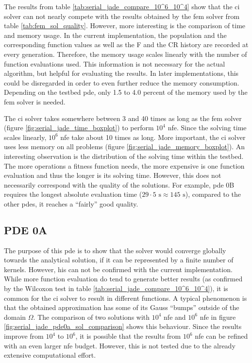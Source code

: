 \documentclass[./\jobname.tex]{subfiles}
\begin{document}
The results from table \ref{tab:serial_jade_compare_10^6_10^4} show that the \gls{ci} solver can not nearly compete with the results obtained by the \gls{fem} solver from table \ref{tab:fem_sol_quality}. 
However, more interesting is the comparison of time and memory usage. 
In the current implementation, the population and the corresponding function values as well as the F and the CR history are recorded at every generation. Therefore, the memory usage scales linearly with the number of function evaluations used. This information is not necessary for the actual algorithm, but helpful for evaluating the results. In later implementations, this could be disregarded in order to even further reduce the memory consumption. Depending on the testbed \gls{pde}, only 1.5 to 4.0 percent of the memory used by the \gls{fem} solver is needed.

The \gls{ci} solver takes somewhere between 3 and 40 times as long as the \gls{fem} solver (figure \ref{fig:serial_jade_time_boxplot}) to perform $10^4$ \gls{nfe}. Since the solving time scales linearly, $10^6$ \gls{nfe} take about 10 times as long. More important, the \gls{ci} solver uses less memory on all problems (figure \ref{fig:serial_jade_memory_boxplot}). An interesting observation is the distribution of the solving time within the testbed. The more operations a fitness function needs, the more expensive is one function evaluation and thus the longer is its solving time. However, this does not necessarily correspond with the quality of the solutions. For example, \gls{pde} 0B requires the longest absolute evaluation time ($29 \cdot 5 \text{ s} \approx 145\text{ s}$), compared to the other \gls{pde}s, it reaches a ``fairly'' good quality. 



\subsection{PDE 0A}
\label{chap: experiment_0_pde_0A}

The purpose of this \gls{pde} is to show that the solver would converge globally towards the analytical solution, if it can be represented by a finite number of kernels. However, his can not be confirmed with the current implementation. While more function evaluation do tend to generate better results (as confirmed by the Wilcoxon test in table \ref{tab:serial_jade_compare_10^6_10^4}), it is common for the \gls{ci} solver to result in different functions. A typical phenomenon is that the obtained approximation has some of its Gauss ``bumps'' outside of the domain $\Omega$. The comparison of two solutions with $10^4$ \gls{nfe} and $10^6$ \gls{nfe} in figure \ref{fig:serial_jade_pde0a_sol_comparison} shows this behaviour. Since the results improve from $10^4$ to $10^6$, it is possible that the results from $10^6$ \gls{nfe} can be refined with an even larger \gls{nfe} budget. However, this is not tested due to the already extensive computational effort. 
\end{document}
